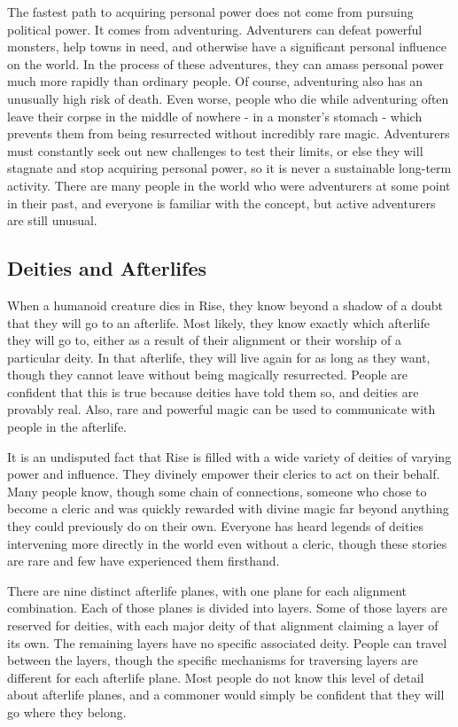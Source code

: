         The fastest path to acquiring personal power does not come from pursuing political power.
        It comes from adventuring.
        Adventurers can defeat powerful monsters, help towns in need, and otherwise have a significant personal influence on the world.
        In the process of these adventures, they can amass personal power much more rapidly than ordinary people.
        Of course, adventuring also has an unusually high risk of death.
        Even worse, people who die while adventuring often leave their corpse in the middle of nowhere - in a monster's stomach - which prevents them from being resurrected without incredibly rare magic.
        Adventurers must constantly seek out new challenges to test their limits, or else they will stagnate and stop acquiring personal power, so it is never a sustainable long-term activity.
        There are many people in the world who were adventurers at some point in their past, and everyone is familiar with the concept, but active adventurers are still unusual.

    \subsection{Deities and Afterlifes}\label{Deities and Afterlifes}
        When a humanoid creature dies in Rise, they know beyond a shadow of a doubt that they will go to an afterlife.
        Most likely, they know exactly which afterlife they will go to, either as a result of their alignment or their worship of a particular deity.
        In that afterlife, they will live again for as long as they want, though they cannot leave without being magically resurrected.
        People are confident that this is true because deities have told them so, and deities are provably real.
        Also, rare and powerful magic can be used to communicate with people in the afterlife.

        It is an undisputed fact that Rise is filled with a wide variety of deities of varying power and influence.
        They divinely empower their clerics to act on their behalf.
        Many people know, though some chain of connections, someone who chose to become a cleric and was quickly rewarded with divine magic far beyond anything they could previously do on their own.
        Everyone has heard legends of deities intervening more directly in the world even without a cleric, though these stories are rare and few have experienced them firsthand.

        There are nine distinct afterlife planes, with one plane for each alignment combination.
        Each of those planes is divided into layers.
        Some of those layers are reserved for deities, with each major deity of that alignment claiming a layer of its own.
        The remaining layers have no specific associated deity.
        People can travel between the layers, though the specific mechanisms for traversing layers are different for each afterlife plane.
        Most people do not know this level of detail about afterlife planes, and a commoner would simply be confident that they will go where they belong.

